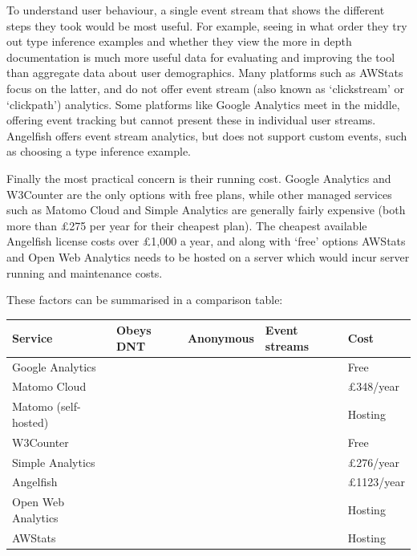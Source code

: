 \documentclass[a4paper,fleqn,oneside,12pt]{report}
\newcommand{\cmark}{\ding{51}}
\newcommand{\xmark}{\ding{55}}
\begin{document}
To understand user behaviour, a single event stream that shows the different steps they took would be most useful. For example, seeing in what order they try out type inference examples and whether they view the more in depth documentation is much more useful data for evaluating and improving the tool than aggregate data about user demographics. Many platforms such as AWStats focus on the latter, and do not offer event stream (also known as `clickstream' or `clickpath') analytics. Some platforms like Google Analytics meet in the middle, offering event tracking but cannot present these in individual user streams. Angelfish offers event stream analytics, but does not support custom events, such as choosing a type inference example.

Finally the most practical concern is their running cost. Google Analytics and W3Counter are the only options with free plans, while other managed services such as Matomo Cloud and Simple Analytics are generally fairly expensive (both more than £275 per year for their cheapest plan). The cheapest available Angelfish license costs over £1,000 a year, and along with `free' options AWStats and Open Web Analytics needs to be hosted on a server which would incur server running and maintenance costs.

These factors can be summarised in a comparison table:

\begin{adjustbox}{center}\begin{tabular}{ |l|l|l|l|l| }
  \hline
  \textbf{Service} & \textbf{Obeys DNT} & \textbf{Anonymous} & \textbf{Event streams} & \textbf{Cost} \\
  \hline
  Google Analytics & \xmark & \xmark & \xmark & Free \\
  \hline
  Matomo Cloud & \cmark & \cmark & \cmark & £348/year \\
  \hline
  Matomo (self-hosted) & \cmark & \cmark & \cmark & Hosting \\
  \hline
  W3Counter & \xmark & \xmark & \cmark & Free \\
  \hline
  Simple Analytics & \cmark & \cmark & \cmark & £276/year \\
  \hline
  Angelfish & \xmark & \xmark & \cmark & £1123/year \\
  \hline
  Open Web Analytics & \xmark & \xmark & \cmark & Hosting \\
  \hline
  AWStats & \xmark & \xmark & \xmark & Hosting \\
  \hline
\end{tabular}\end{adjustbox}\\
\end{document}
